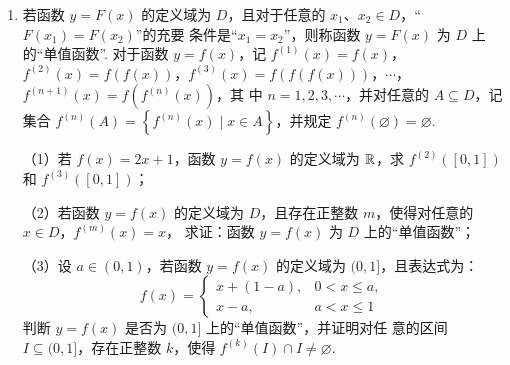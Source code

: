 \documentclass[a4paper,11pt]{article}
\begin{document}
\begin{enumerate}
\item 若函数 $y=F(x)$ 的定义域为 $D$，且对于任意的 $x_1$、$x_2\in D$，“$F(x_1)=F(x_2)$”的充要
条件是“$x_1=x_2$”，则称函数 $y=F(x)$ 为 $D$ 上的“单值函数”. 对于函数 $y=f(x)$，记
$f^{(1)}(x)=f(x)$，$f^{(2)}(x)=f(f(x))$，$f^{(3)}(x)=f(f(f(x)))$，$\cdots$，$f^{(n+1)}(x)=f(f^{(n)}(x))$，其
中 $n=1,2,3,\cdots$，并对任意的 $A\subseteq D$，记集合 $f^{(n)}(A)=\left\{f^{(n)}(x)\mid x\in A\right\}$，并规定
$f^{(n)}(\varnothing)=\varnothing$.

（1）若 $f(x)=2x+1$，函数 $y=f(x)$ 的定义域为 $\mathbb{R}$，求 $f^{(2)}([0,1])$ 和 $f^{(3)}([0,1])$；

（2）若函数 $y=f(x)$ 的定义域为 $D$，且存在正整数 $m$，使得对任意的 $x\in D$，$f^{(m)}(x)=x$，
求证：函数 $y=f(x)$ 为 $D$ 上的“单值函数”；

（3）设 $a\in(0,1)$，若函数 $y=f(x)$ 的定义域为 $(0,1]$，且表达式为：
\[f(x)=\begin{cases}x+(1-a),&0<x\leqslant a,\\x-a,&a<x\leqslant1\end{cases}\]
判断 $y=f(x)$ 是否为 $(0,1]$ 上的“单值函数”，并证明对任
意的区间 $I\subseteq(0,1]$，存在正整数 $k$，使得 $f^{(k)}(I)\cap I\neq\varnothing$.


\end{enumerate}
\end{document}
